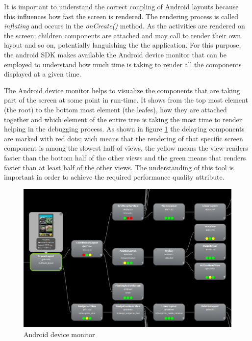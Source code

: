 It is important to understand the correct coupling of Android layouts because this influences how fast the screen is rendered. The rendering process is called \textit{inflating} and occurs in the \textit{onCreate()} method. As the activities are rendered on the screen; children components are attached and may call to render their own layout and so on, potentially languishing the the application. For this purpose, the android SDK makes available the Android device monitor that can be employed to understand how much time is taking to render all the components displayed at a given time. 

The Android device monitor helps to visualize the components that are taking part of the screen at some point in run-time. It shows from the top most element (the root) to the bottom most element (the leafes), how they are attached together and which element of the entire tree is taking the most time to render helping in the debugging process. As shown in figure \ref{fig:android_device_monitor} the delaying components are marked with red dots; wich means that the rendering of that specific screen component is among the slowest half of views, the yellow means the view renders faster than the bottom half of the other views and the green means that renders faster than at least half of the other views. The understanding of this tool is important in order to achieve the required performance quality attribute. 

\begin{figure}[H]
\begin{adjustbox}{width=1\textwidth,center=\textwidth}
  \centering
  \includegraphics[scale=1]{images/android_device_monitor_2.png}
\end{adjustbox}
  \caption[Andrroid activities lifecycle]{Android device monitor}
  \label{fig:android_device_monitor}
\end{figure}

